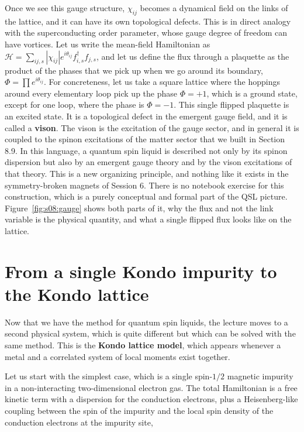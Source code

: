 Once we see this gauge structure, $\chi_{ij}$ becomes a dynamical field on the links of the
lattice, and it can have its own topological defects. This is in direct analogy with the superconducting
order parameter, whose gauge degree of freedom can have vortices. Let us write the
mean-field Hamiltonian as $\mathcal H = \sum_{ij,s}|\chi_{ij}|e^{i\theta_{ij}}f^\dagger_{i,s}f_{j,s}$,
and let us define the flux through a plaquette as the product of the phases that we pick up when we
go around its boundary, $\Phi = \prod e^{i\theta_{ij}}$. For concreteness, let us take a square
lattice where the hoppings around every elementary loop pick up the phase $\Phi=+1$, which is a
ground state, except for one loop, where the phase is $\Phi=-1$. This single flipped plaquette is an
excited state. It is a topological defect in the emergent gauge field, and it is called a
\textbf{vison}. The vison is the excitation of the gauge sector, and in general it is coupled to the
spinon excitations of the matter sector that we built in Section 8.9. In this language, a quantum
spin liquid is described not only by its spinon dispersion but also by an emergent gauge theory and
by the vison excitations of that theory. This is a new organizing principle, and nothing like it
exists in the symmetry-broken magnets of Session 6. There is no notebook exercise for this
construction, which is a purely conceptual and formal part of the QSL picture.
Figure~\ref{fig:s08:gauge} shows both parts of it, why the flux and not the link variable is the
physical quantity, and what a single flipped flux looks like on the lattice.



\section{From a single Kondo impurity to the Kondo lattice}

Now that we have the method for quantum spin liquids, the lecture moves to a second physical
system, which is quite different but which can be solved with the same method. This is the
\textbf{Kondo lattice model}, which appears whenever a metal and a correlated system of local
moments exist together.

Let us start with the simplest case, which is a single spin-$1/2$ magnetic impurity in a
non-interacting two-dimensional electron gas. The total Hamiltonian is a free kinetic term with a
dispersion for the conduction electrons, plus a Heisenberg-like coupling between the spin of the
impurity and the local spin density of the conduction electrons at the impurity site,

